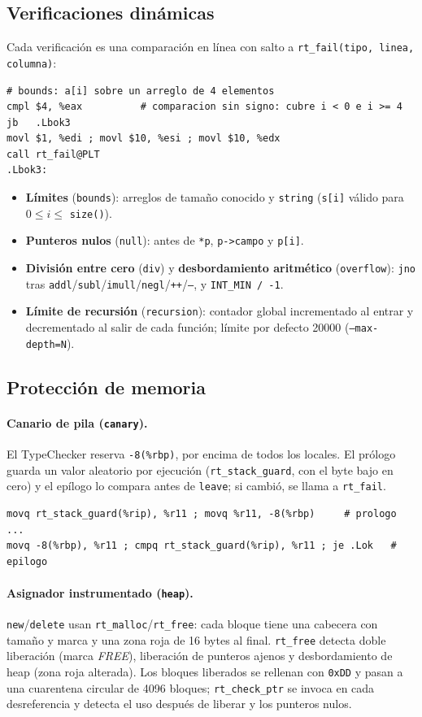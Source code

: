 \documentclass[11pt,a4paper]{article}
\newcommand{\cod}[1]{\texttt{#1}}
\begin{document}
\subsection{Verificaciones dinámicas}
Cada verificación es una comparación en línea con salto a \cod{rt\_fail(tipo, linea, columna)}:
\begin{lstlisting}
# bounds: a[i] sobre un arreglo de 4 elementos
cmpl $4, %eax          # comparacion sin signo: cubre i < 0 e i >= 4
jb   .Lbok3
movl $1, %edi ; movl $10, %esi ; movl $10, %edx
call rt_fail@PLT
.Lbok3:
\end{lstlisting}
\begin{itemize}
  \item \textbf{Límites} (\cod{bounds}): arreglos de tamaño conocido y \cod{string} (\cod{s[i]} válido para $0 \le i \le$ \cod{size()}).
  \item \textbf{Punteros nulos} (\cod{null}): antes de \cod{*p}, \cod{p->campo} y \cod{p[i]}.
  \item \textbf{División entre cero} (\cod{div}) y \textbf{desbordamiento aritmético} (\cod{overflow}):
        \cod{jno} tras \cod{addl}/\cod{subl}/\cod{imull}/\cod{negl}/\cod{++}/\cod{--}, y \cod{INT\_MIN / -1}.
  \item \textbf{Límite de recursión} (\cod{recursion}): contador global incrementado al entrar y decrementado al
        salir de cada función; límite por defecto 20000 (\cod{--max-depth=N}).
\end{itemize}

\subsection{Protección de memoria}
\paragraph{Canario de pila (\cod{canary}).} El TypeChecker reserva \cod{-8(\%rbp)}, por encima de todos los locales.
El prólogo guarda un valor aleatorio por ejecución (\cod{rt\_stack\_guard}, con el byte bajo en cero) y el epílogo lo
compara antes de \cod{leave}; si cambió, se llama a \cod{rt\_fail}.
\begin{lstlisting}
movq rt_stack_guard(%rip), %r11 ; movq %r11, -8(%rbp)     # prologo
...
movq -8(%rbp), %r11 ; cmpq rt_stack_guard(%rip), %r11 ; je .Lok   # epilogo
\end{lstlisting}
\paragraph{Asignador instrumentado (\cod{heap}).} \cod{new}/\cod{delete} usan \cod{rt\_malloc}/\cod{rt\_free}: cada
bloque tiene una cabecera con tamaño y marca y una zona roja de 16 bytes al final. \cod{rt\_free} detecta
doble liberación (marca \emph{FREE}), liberación de punteros ajenos y desbordamiento de heap (zona roja alterada).
Los bloques liberados se rellenan con \cod{0xDD} y pasan a una cuarentena circular de 4096 bloques;
\cod{rt\_check\_ptr} se invoca en cada desreferencia y detecta el uso después de liberar y los punteros nulos.
\end{document}
